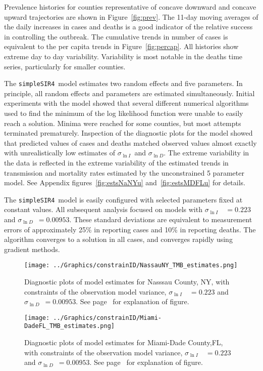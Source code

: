 \documentclass[12pt,letterpaper]{article}
\newcommand\SSm{{\tt simpleSIR4}}
\newcommand\slI{$\sigma_{\ln I}$\ }
\newcommand\slD{$\sigma_{\ln D}$}
\begin{document}
Prevalence histories for counties representative of concave
downward and concave upward trajectories are shown in
Figure~\ref{fig:prev}. The 11-day moving averages of the daily
increases in cases and deaths is a good indicator of the
relative success in controlling the outbreak.
The cumulative trends in number of cases is equivalent to 
the per capita trends in Figure~\ref{fig:percap}.
All histories show extreme day to day variability.
Variability is most notable in the deaths
time series, particularly for smaller counties.

The \SSm\  model estimates two random effects and five parameters.
In principle, all random effects and parameters are estimated
simultaneously.
Initial experiments with the model showed that several different
numerical algorithms used to find the minimum of the log likelihood
function were unable to easily reach a solution. Minima were reached
for some counties, but most attempts terminated prematurely. 
Inspection of the diagnostic plots for the model showed that predicted
values of cases and deaths matched observed values almost exactly
with unrealistically low estimates of \slI and \slD.
The extreme variability in the data is reflected in the extreme
variability of the estimated trends in transmission and mortality
rates estimated by the unconstrained 5 parameter model.
See Appendix figures~\ref{fig:estsNaNYu} and~\ref{fig:estsMDFLu}
for details.

The \SSm\ model is easily configured with selected parameters fixed at
constant values. 
All subsequent analysis focused on models with 
\slI~$ = 0.223$ and \slD~$= 0.00953$. 
These standard deviations are equivalent to measurement errors of
approximately 25\% in reporting cases and 10\% in reporting deaths.
The algorithm converges to a solution in all cases, and converges
rapidly using gradient methods.

\begin{figure}
\begin{center}
\texttt{[image: ../Graphics/constrainID/NassauNY\_TMB\_estimates.png]}
\end{center}
\caption{\label{fig:estsNaNYc}
Diagnostic plots of model estimates for Nasssau County, NY, 
with constraints of the observation model variance, 
\slI~$ = 0.223$ and \slD~$= 0.00953$. 
See page~\pageref{pp:diagexpl} for explanation of figure.
}
\end{figure}

\begin{figure}
\begin{center}
\texttt{[image: ../Graphics/constrainID/Miami-DadeFL\_TMB\_estimates.png]}
\end{center}
\caption{\label{fig:estsMDFLc}
Diagnostic plots of model estimates for Miami-Dade County,FL,
with constraints of the observation model variance, 
\slI~$ = 0.223$ and \slD~$= 0.00953$. 
See page~\pageref{pp:diagexpl} for explanation of figure.
}
\end{figure}
\end{document}

